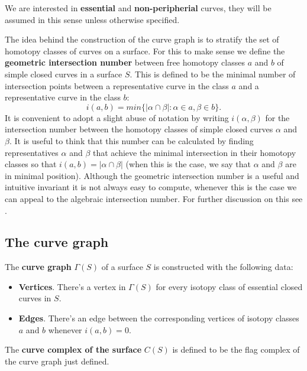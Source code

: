 We are interested in \textbf{essential} and \textbf{non-peripherial} curves, they will be assumed in this sense unless otherwise specified.

The idea behind the construction of the curve graph is to stratify the set of homotopy classes of curves on a surface. For this to make sense we define the \textbf{geometric intersection number} between free homotopy classes $a$ and $b$ of simple closed curves in a surface $S$. This is defined to be the minimal number of intersection points between a representative curve in the class $a$ and a representative curve in the class $b$:
$$i(a,b) = min \{ |\alpha \cap \beta| : \alpha \in a, \beta \in b \}.$$
It is convenient to adopt a slight abuse of notation by writing $i(\alpha, \beta)$ for the intersection number between the homotopy classes of simple closed curves $\alpha$ and $\beta$. It is useful to think that this number can be calculated by finding representatives $\alpha$ and $\beta$ that achieve the minimal intersection in their homotopy classes so that $i(a, b) = |\alpha \cap \beta|$ (when this is the case, we say that $\alpha$ and $\beta$ are in minimal position). Although the geometric intersection number is a useful and intuitive invariant it is not always easy to compute, whenever this is the case we can appeal to the algebraic intersection number. For further discussion on this see \cite[Farb]{Farb}.

\subsection{The curve graph}

\begin{defini}
The \textbf{curve graph} $\Gamma(S)$ of a surface $S$ is constructed with the following data:
\begin{itemize}
\item \textbf{Vertices}. There's a vertex in $\Gamma(S)$ for every isotopy class of essential closed curves in $S$.
\item \textbf{Edges}. There's an edge between the corresponding vertices of isotopy classes $a$ and $b$ whenever $i(a,b)=0$.
\end{itemize}
\end{defini}

\begin{defini}
The \textbf{curve complex of the surface} $C(S)$ is defined to be the flag complex of the curve graph just defined.
\end{defini}

